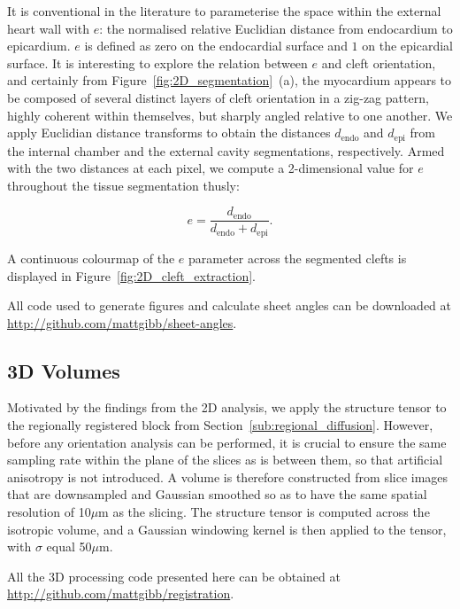     It is conventional in the literature to parameterise the space within the external heart wall with $e$: the normalised relative Euclidian distance from endocardium to epicardium. $e$ is defined as zero on the endocardial surface and $1$ on the epicardial surface. It is interesting to explore the relation between $e$ and cleft orientation, and certainly from Figure~\ref{fig:2D_segmentation}~(a), the myocardium appears to be composed of several distinct layers of cleft orientation in a zig-zag pattern, highly coherent within themselves, but sharply angled relative to one another. We apply Euclidian distance transforms to obtain the distances $d_{\text{endo}}$ and $d_{\text{epi}}$ from the internal chamber and the external cavity segmentations, respectively. Armed with the two distances at each pixel, we compute a 2-dimensional value for $e$ throughout the tissue segmentation thusly:
  
    \begin{equation}
      e = \frac{d_{\text{endo}}}{d_{\text{endo}} + d_{\text{epi}} }.
    \end{equation}
  
    A continuous colourmap of the $e$ parameter across the segmented clefts is displayed in Figure~\ref{fig:2D_cleft_extraction}.
    
    All code used to generate figures and calculate sheet angles can be downloaded at \url{http://github.com/mattgibb/sheet-angles}.
  
  \subsection{3D Volumes} %
  \label{sub:3d_volumes}
    Motivated by the findings from the 2D analysis, we apply the structure tensor to the regionally registered block from Section~\ref{sub:regional_diffusion}. However, before any orientation analysis can be performed, it is crucial to ensure the same sampling rate within the plane of the slices as is between them, so that artificial anisotropy is not introduced. A volume is therefore constructed from slice images that are downsampled and Gaussian smoothed so as to have the same spatial resolution of 10$\mu$m as the slicing. The structure tensor is computed across the isotropic volume, and a Gaussian windowing kernel is then applied to the tensor, with $\sigma$ equal 50$\mu$m.
  
    All the 3D processing code presented here can be obtained at \url{http://github.com/mattgibb/registration}.

